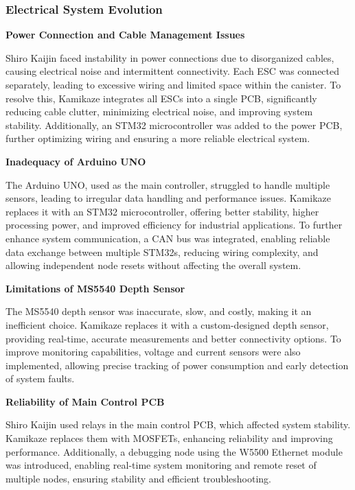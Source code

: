 \subsubsection{Electrical System Evolution}

\textbf{Power Connection and Cable Management Issues}

Shiro Kaijin faced instability in power connections due to disorganized cables, causing electrical noise and intermittent connectivity. Each ESC was connected separately, leading to excessive wiring and limited space within the canister. To resolve this, Kamikaze integrates all ESCs into a single PCB, significantly reducing cable clutter, minimizing electrical noise, and improving system stability. Additionally, an STM32 microcontroller was added to the power PCB, further optimizing wiring and ensuring a more reliable electrical system.

\vspace{0.2cm}
\textbf{Inadequacy of Arduino UNO}

The Arduino UNO, used as the main controller, struggled to handle multiple sensors, leading to irregular data handling and performance issues. Kamikaze replaces it with an STM32 microcontroller, offering better stability, higher processing power, and improved efficiency for industrial applications. To further enhance system communication, a CAN bus was integrated, enabling reliable data exchange between multiple STM32s, reducing wiring complexity, and allowing independent node resets without affecting the overall system.

\vspace{0.2cm}
\textbf{Limitations of MS5540 Depth Sensor}

The MS5540 depth sensor was inaccurate, slow, and costly, making it an inefficient choice. Kamikaze replaces it with a custom-designed depth sensor, providing real-time, accurate measurements and better connectivity options. To improve monitoring capabilities, voltage and current sensors were also implemented, allowing precise tracking of power consumption and early detection of system faults.

\vspace{0.2cm}
\textbf{Reliability of Main Control PCB}

Shiro Kaijin used relays in the main control PCB, which affected system stability. Kamikaze replaces them with MOSFETs, enhancing reliability and improving performance. Additionally, a debugging node using the W5500 Ethernet module was introduced, enabling real-time system monitoring and remote reset of multiple nodes, ensuring stability and efficient troubleshooting.

